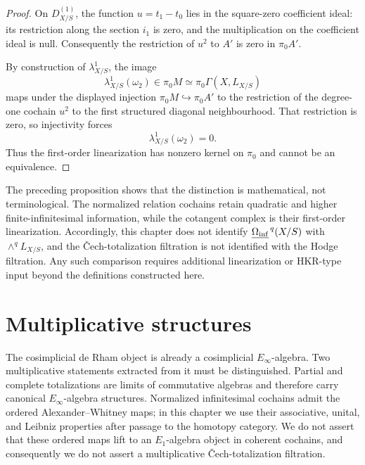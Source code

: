 \begin{proof}
On \(D^{(1)}_{X/S}\), the function \(u=t_1-t_0\) lies in the square-zero
coefficient ideal: its restriction along the section \(i_1\) is zero, and the
multiplication on the coefficient ideal is null.  Consequently the restriction
of \(u^2\) to \(A'\) is zero in \(\pi_0A'\).

By construction of \(\lambda^1_{X/S}\), the image
\[
    \lambda^1_{X/S}(\omega_2)
    \in
    \pi_0M
    \simeq
    \pi_0\Gamma(X,L_{X/S})
\]
maps under the displayed injection \(\pi_0M\hookrightarrow\pi_0A'\) to the
restriction of the degree-one cochain \(u^2\) to the first structured diagonal
neighbourhood.  That restriction is zero, so injectivity forces
\[
\boxed{
    \lambda^1_{X/S}(\omega_2)=0.
}
\]
Thus the first-order linearization has nonzero kernel on \(\pi_0\) and cannot
be an equivalence.
\end{proof}

\begin{remark}
\label{rem:normalized-cochains-not-cotangent-forms}
The preceding proposition shows that the distinction is mathematical, not terminological.  The
normalized relation cochains retain quadratic and higher finite-infinitesimal information, while the
cotangent complex is their first-order linearization.  Accordingly, this chapter does not identify
\(\underline{\Omega_{\mathrm{inf}}}^{\,q}(X/S)\) with \(\wedge^qL_{X/S}\), and the
\v{C}ech-totalization filtration is not identified with the Hodge filtration.  Any such comparison
requires additional linearization or HKR-type input beyond the definitions constructed here.
\end{remark}


\section{Multiplicative structures}
\label{sec:multiplicative-modal-de-rham}

The cosimplicial de Rham object is already a cosimplicial \(E_\infty\)-algebra.  Two multiplicative
statements extracted from it must be distinguished.  Partial and complete totalizations are limits of
commutative algebras and therefore carry canonical \(E_\infty\)-algebra structures.  Normalized
infinitesimal cochains admit the ordered Alexander--Whitney maps; in this chapter we use their associative, unital,
and Leibniz properties after passage to the homotopy category.  We do not assert that these ordered
maps lift to an \(E_1\)-algebra object in coherent cochains, and consequently we do not assert a
multiplicative \v{C}ech-totalization filtration.

